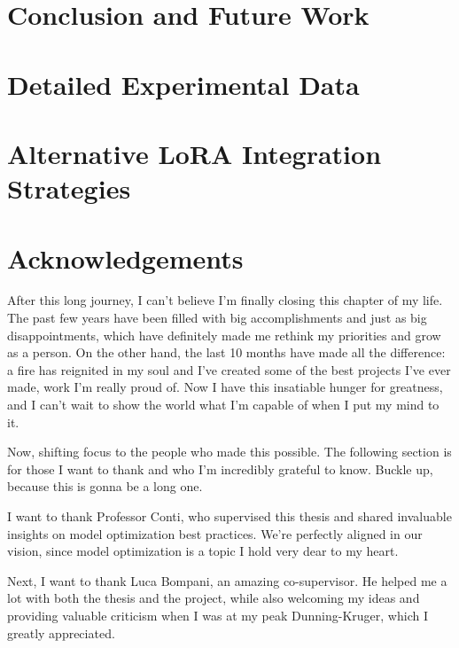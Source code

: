\documentclass[12pt,a4paper,openright,twoside]{report}
\begin{document}
\chapter{Conclusion and Future Work}
\label{chap:conclusion}
\lhead[\fancyplain{}{\bfseries\thepage}]{\fancyplain{}{\bfseries\rightmark}}




\appendix
\chapter{Detailed Experimental Data}
\label{app:appendix1}


\chapter{Alternative LoRA Integration Strategies}
\label{app:appendix2}


\chapter*{Acknowledgements}

After this long journey, I can't believe I'm finally closing this chapter of my life. The past few years have been filled with big accomplishments and just as big disappointments, which have definitely made me rethink my priorities and grow as a person. On the other hand, the last 10 months have made all the difference: a fire has reignited in my soul and I've created some of the best projects I've ever made, work I'm really proud of. Now I have this insatiable hunger for greatness, and I can't wait to show the world what I'm capable of when I put my mind to it.

Now, shifting focus to the people who made this possible. The following section is for those I want to thank and who I'm incredibly grateful to know. Buckle up, because this is gonna be a long one.

I want to thank Professor Conti, who supervised this thesis and shared invaluable insights on model optimization best practices. We're perfectly aligned in our vision, since model optimization is a topic I hold very dear to my heart.

Next, I want to thank Luca Bompani, an amazing co-supervisor. He helped me a lot with both the thesis and the project, while also welcoming my ideas and providing valuable criticism when I was at my peak Dunning-Kruger, which I greatly appreciated.
\end{document}
